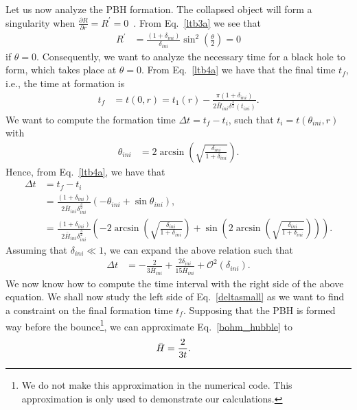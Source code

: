 \documentclass[a4paper,11pt]{article}
\begin{document}
Let us now analyze the PBH formation. The collapsed object will form a singularity when $\frac{\partial R}{\partial r} = {R}^\prime = 0$~\cite{Dey2023}. From Eq.~\eqref{ltb3a} we see that 
\begin{align}
	{R}^\prime &= \frac{ (1+\delta_{ini})}{\delta_{ini}}\sin^2\left(\frac{\theta}{2}\right) = 0
\end{align}
if $\theta = 0$. Consequently, we want to analyze the necessary time for a black hole to form, which takes place at $\theta = 0$. From Eq.~\eqref{ltb4a} we have that the final time $t_f$, i.e., the time at formation is
\begin{align}
	 t_f &= t(0,r ) =t_1(r) - \frac{\pi(1 + \delta_{ini})}{2\bar{H}_{ini}\delta^{\frac{3}{2}}(t_{ini})}
.\end{align}
We want to compute the formation time $\Delta t = t_f - t_i$, such that $t_i = t(\theta_{ini}, r)$ with
\begin{align}
    \theta_{ini} &= 2\arcsin(\sqrt{\frac{\delta_{ini}}{1+\delta_{ini}}})
.\end{align}
Hence, from Eq.~\eqref{ltb4a}, we have that
\begin{align}
\label{criticallinear}
    \Delta t &= t_f - t_i \nonumber \\
     &=\frac{(1 + \delta_{ini})}{2\bar{H}_{ini}\delta^{\frac{3}{2}}_{ini} } \left(  -\theta_{ini} +\sin{\theta_{ini}}\right) ,\nonumber \\
   &=\frac{(1 + \delta_{ini})}{2\bar{H}_{ini}\delta^{\frac{3}{2}}_{ini} } \left( -2\arcsin(\sqrt{\frac{\delta_{ini}}{1+\delta_{ini}}}) +\sin(2\arcsin(\sqrt{\frac{\delta_{ini}}{1+\delta_{ini}}}))\right)  
.\end{align}
Assuming that $\delta_{ini} \ll 1$, we can expand the above relation such that
\begin{align}
\label{deltasmall}
    \Delta t &= -\frac{2}{3\bar{H}_{ini}}+\frac{2\delta_{ini}}{15\bar{H}_{ini}} + \mathcal{O}^2(\delta_{ini})
.\end{align}
We now know how to compute the time interval with the right side of the above equation. We shall now study the left side of Eq.~\eqref{deltasmall} as we want to find a constraint on the final formation time $t_f$. Supposing that the PBH is formed way before the bounce\footnote{We do not make this approximation in the numerical code. This approximation is only used to demonstrate our calculations.}, we can approximate Eq.~\eqref{bohm_hubble} to
\begin{align}
\label{hubblefarbounce}
    \Bar{H}&= \frac{2}{3t}
.\end{align}
\end{document}
